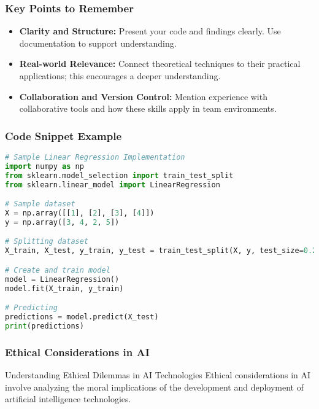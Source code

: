 \documentclass[aspectratio=169]{beamer}
\begin{document}
\begin{frame}[fragile]
    \frametitle{Key Points to Remember}
    \begin{itemize}
        \item \textbf{Clarity and Structure:} Present your code and findings clearly. Use documentation to support understanding.
        
        \item \textbf{Real-world Relevance:} Connect theoretical techniques to their practical applications; this encourages a deeper understanding.
        
        \item \textbf{Collaboration and Version Control:} Mention experience with collaborative tools and how these skills apply in team environments.
    \end{itemize}
\end{frame}

\begin{frame}[fragile]
    \frametitle{Code Snippet Example}
    \begin{lstlisting}[language=Python]
# Sample Linear Regression Implementation
import numpy as np
from sklearn.model_selection import train_test_split
from sklearn.linear_model import LinearRegression

# Sample dataset
X = np.array([[1], [2], [3], [4]])
y = np.array([3, 4, 2, 5])

# Splitting dataset
X_train, X_test, y_train, y_test = train_test_split(X, y, test_size=0.2)

# Create and train model
model = LinearRegression()
model.fit(X_train, y_train)

# Predicting
predictions = model.predict(X_test)
print(predictions)
    \end{lstlisting}
\end{frame}

\begin{frame}[fragile]
    \frametitle{Ethical Considerations in AI}
    \begin{block}{Understanding Ethical Dilemmas in AI Technologies}
        Ethical considerations in AI involve analyzing the moral implications of the development and deployment of artificial intelligence technologies.
    \end{block}
\end{frame}
\end{document}
